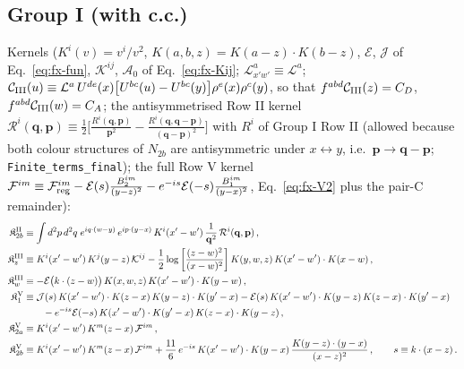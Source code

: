 {\subsection{Group I (with c.c.)}
\noindent Kernels ($K^{i}(v)=v^{i}/v^{2}$, $K(a,b,z)=K(a-z)\cdot K(b-z)$, $\mathcal{E}$, $\mathcal{J}$ of Eq.~\eqref{eq:fx-fun}, $\mathcal{K}^{ij}$, $\mathcal{A}_{0}$ of Eq.~\eqref{eq:fx-Kij}; $\mathcal{L}^{a}_{x'w'}\equiv\mathcal{L}^{a}$; $\mathcal{C}_{\rm III}(u)\equiv\mathcal{L}^{a}\,U^{de}(x)\big[U^{bc}(u)-U^{bc}(y)\big]\rho^{e}(x)\rho^{c}(y)$, so that $f^{abd}\mathcal{C}_{\rm III}(z)=C_{D}$, $f^{abd}\mathcal{C}_{\rm III}(w)=C_{A}$; the antisymmetrised Row II kernel $\mathcal{R}^{i}(\mathbf{q},\mathbf{p})\equiv\frac12\big[\frac{R^{i}(\mathbf{q},\mathbf{p})}{\mathbf{p}^{2}}-\frac{R^{i}(\mathbf{q},\mathbf{q}-\mathbf{p})}{(\mathbf{q}-\mathbf{p})^{2}}\big]$ with $R^{i}$ of Group I Row II (allowed because both colour structures of $N_{2b}$ are antisymmetric under $x\leftrightarrow y$, i.e.\ $\mathbf{p}\to\mathbf{q}-\mathbf{p}$; \texttt{Finite\_terms\_final}); the full Row V kernel $\mathcal{F}^{im}\equiv\mathcal{F}^{im}_{\rm reg}-\mathcal{E}(s)\frac{B_{2}^{im}}{(y-z)^{2}}-e^{-is}\mathcal{E}(-s)\frac{B_{1}^{im}}{(y-x)^{2}}$, Eq.~\eqref{eq:fx-V2} plus the pair-C remainder):
\begin{align}
\mathfrak{K}^{\rm II}_{2b}&\equiv\int d^{2}p\,d^{2}q\;e^{iq\cdot(w-y)}\,e^{ip\cdot(y-x)}\,K^{i}(x'-w')\,\frac{1}{\mathbf{q}^{2}}\,\mathcal{R}^{i}(\mathbf{q},\mathbf{p})\,,\notag\\
\mathfrak{K}^{\rm III}_{z}&\equiv K^{i}(x'-w')\,K^{j}(y-z)\,\mathcal{K}^{ij}-\frac12\log\left[\frac{(z-w)^{2}}{(x-w)^{2}}\right]K(y,w,z)\,K(x'-w')\cdot K(x-w)\,,\notag\\
\mathfrak{K}^{\rm III}_{w}&\equiv-\mathcal{E}\big(k\cdot(z-w)\big)\,K(x,w,z)\,K(x'-w')\cdot K(y-w)\,,\notag\\
\mathfrak{K}^{\rm V}_{1}&\equiv\mathcal{J}(s)\,K(x'-w')\cdot K(z-x)\,K(y-z)\cdot K(y'-x)-\mathcal{E}(s)\,K(x'-w')\cdot K(y-z)\,K(z-x)\cdot K(y'-x)\notag\\&\qquad-e^{-is}\mathcal{E}(-s)\,K(x'-w')\cdot K(y'-x)\,K(z-x)\cdot K(y-z)\,,\notag\\
\mathfrak{K}^{\rm V}_{2a}&\equiv K^{i}(x'-w')\,K^{m}(z-x)\,\mathcal{F}^{im}\,,\notag\\
\mathfrak{K}^{\rm V}_{2b}&\equiv K^{i}(x'-w')\,K^{m}(z-x)\,\mathcal{F}^{im}+\frac{11}{6}\,e^{-is}\,K(x'-w')\cdot K(y-x)\,\frac{K(y-z)\cdot(y-x)}{(x-z)^{2}}\,,\qquad s\equiv k\cdot(x-z)\,.\notag
\end{align}

}
